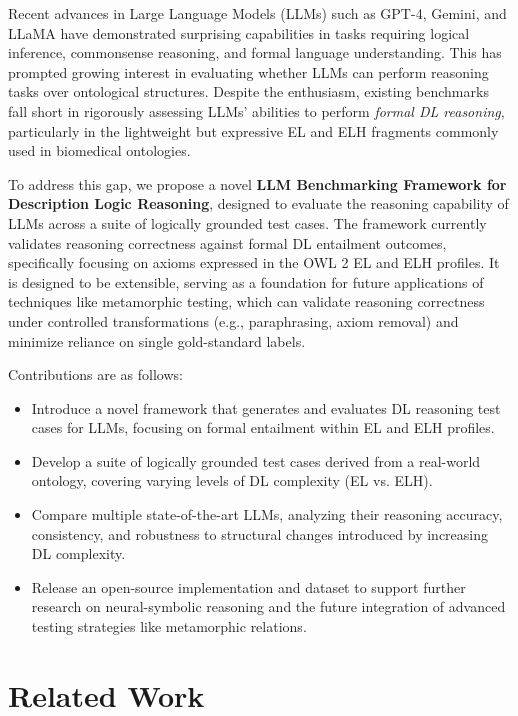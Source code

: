 \documentclass[11pt]{article}
\begin{document}
Recent advances in Large Language Models (LLMs) such as GPT-4, Gemini, and LLaMA have demonstrated surprising capabilities in tasks requiring logical inference, commonsense reasoning, and formal language understanding. 
This has prompted growing interest in evaluating whether LLMs can perform reasoning tasks over ontological structures. 
Despite the enthusiasm, existing benchmarks fall short in rigorously assessing LLMs' abilities to perform \textit{formal DL reasoning}, particularly in the lightweight but expressive EL and ELH fragments commonly used in biomedical ontologies\cite{baader2005el}.

To address this gap, we propose a novel \textbf{LLM Benchmarking Framework for Description Logic Reasoning}, designed to evaluate the reasoning capability of LLMs across a suite of logically grounded test cases. 
The framework currently validates reasoning correctness  against formal DL entailment outcomes, specifically focusing on axioms expressed in the OWL 2 EL and ELH profiles.
It is designed to be extensible, serving as a foundation for future applications of techniques like metamorphic testing, which can validate reasoning correctness under controlled transformations (e.g., paraphrasing, axiom removal) and minimize reliance on single gold-standard labels.

Contributions are as follows:
\begin{itemize}
    \item Introduce a novel framework that generates and evaluates DL reasoning test cases for LLMs, focusing on formal entailment within EL and ELH profiles.
    \item Develop a suite of logically grounded test cases derived from a real-world ontology, covering varying levels of DL complexity (EL vs. ELH).
    \item Compare multiple state-of-the-art LLMs, analyzing their reasoning accuracy, consistency, and robustness to structural changes introduced by increasing DL complexity.
    \item Release an open-source implementation and dataset to support further research on neural-symbolic reasoning and the future integration of advanced testing strategies like metamorphic relations\cite{sun2024metamorphic}.
\end{itemize}

\section{Related Work}
\end{document}
